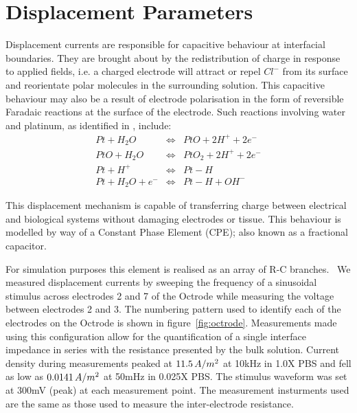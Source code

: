 \documentclass[journal, a4paper]{IEEEtran}
\begin{document}
\section{Displacement Parameters}
{
    \color{blue}
Displacement currents are responsible for capacitive behaviour at interfacial boundaries.
They are brought about by the redistribution of charge in response to applied fields, i.e. a charged electrode will attract or repel $Cl^{-}$ from its surface and reorientate polar molecules in the surrounding solution. This capacitive behaviour may also be a result of electrode polarisation in the form of reversible Faradaic reactions at the surface of the electrode.
Such reactions involving water and platinum, as identified in \cite{Horch2004,Mohtashami2011}, include:
    \begin{eqnarray}
        Pt + H_{2}O &\Leftrightarrow& PtO + 2 H^{+} + 2 e^{-}\\
        PtO + H_{2}O &\Leftrightarrow& PtO_{2} + 2 H^{+} + 2e^{-}\\
        Pt + H^{+} & \Leftrightarrow & Pt-H\\
        Pt + H_{2}O + e^{-} &\Leftrightarrow& Pt-H+OH^{-}
    \end{eqnarray}

This displacement mechanism is capable of transferring charge between electrical and biological systems without damaging electrodes or tissue. \cite{Horch2004}
This behaviour is modelled by way of a Constant Phase Element (CPE); also known as a fractional capacitor.
}
For simulation purposes this element is realised as an array of R-C branches.~\cite{ScottSingle2013,Morrison59,Elwakil10} We measured displacement currents by sweeping the frequency of a sinusoidal stimulus across electrodes 2 and 7 of the Octrode while measuring the voltage between electrodes 2 and 3. 
The numbering pattern used to identify each of the electrodes on the Octrode is shown in figure~\ref{fig:octrode}.
Measurements made using this configuration allow for the quantification of a single interface impedance in series with the resistance presented by the bulk solution.
{
    \color{blue}
Current density during measurements peaked at $11.5\thinspace A/m^{2}$ at 10\thinspace kHz in 1.0X PBS and fell as low as $0.0141\thinspace A/m^{2}$ at 50\thinspace mHz in 0.025X PBS. The stimulus waveform was set at 300\thinspace mV (peak) at each measurement point. The measurement insturments used are the same as those used to measure the inter-electrode resistance.
}
\end{document}
